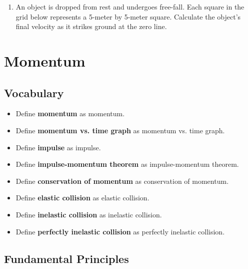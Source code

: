 \documentclass[dvipsnames]{article}
\begin{document}
\begin{enumerate}[itemsep=0pt]
\item An object is dropped from rest and undergoes free-fall. Each square in the grid below represents a 5-meter by 5-meter square. Calculate the object's final velocity as it strikes ground at the zero line.


\begin{center}
\end{center}
\end{enumerate}

\clearpage

\section{Momentum}

\subsection*{Vocabulary}

\vspace{-6pt}

\begin{itemize}[itemsep=0pt]
    \item Define \textbf{\gls{momentum}} as \glsdesc{momentum}.
    \item Define \textbf{\gls{momentum vs. time graph}} as \glsdesc{momentum vs. time graph}.
    \item Define \textbf{\gls{impulse}} as \glsdesc{impulse}.
    \item Define \textbf{\gls{impulse-momentum theorem}} as \glsdesc{impulse-momentum theorem}.
    \item Define \textbf{\gls{conservation of momentum}} as \glsdesc{conservation of momentum}.
    \item Define \textbf{\gls{elastic collision}} as \glsdesc{elastic collision}.
    \item Define \textbf{\gls{inelastic collision}} as \glsdesc{inelastic collision}.
    \item Define \textbf{\gls{perfectly inelastic collision}} as \glsdesc{perfectly inelastic collision}.
\end{itemize}

\subsection*{Fundamental Principles}
\end{document}
